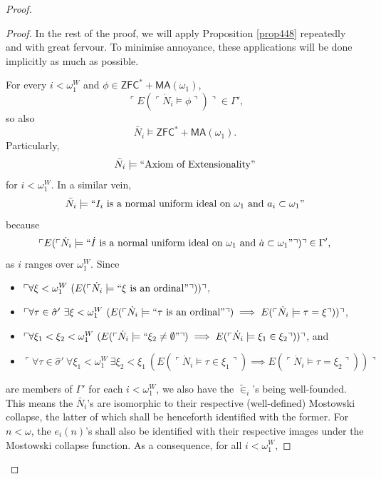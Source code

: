 \documentclass[12pt, twoside]{memoir}
\numberwithin{equation}{section}
\theoremstyle{definition}
\theoremstyle{remark}
\theoremstyle{definition}
\theoremstyle{definition}
\theoremstyle{definition}
\theoremstyle{remark}
\begin{document}
\begin{proof}
\begin{proof}
In the rest of the proof, we will apply Proposition \ref{prop448} repeatedly and with great fervour. To minimise annoyance, these applications will be done implicitly as much as possible. 

For every $i < \omega_1^W$ and $\phi \in \mathsf{ZFC}^* + \mathsf{MA}(\omega_1)$, 
\begin{equation*}
    \ulcorner E(\ulcorner \dot{N}_i \models \phi \urcorner) \urcorner \in \Gamma' \text{,}
\end{equation*}
so also 
\begin{equation*}
    \bar{N}_i \models \mathsf{ZFC}^* + \mathsf{MA}(\omega_1) \text{.}
\end{equation*}
Particularly, 
\begin{equation*}
    \bar{N}_i \models ``\text{Axiom of Extensionality}"
\end{equation*}
for $i < \omega_1^W$. In a similar vein, 
\begin{equation*}
    \bar{N}_i \models ``I_i \text{ is a normal uniform ideal on } \omega_1 \text{ and } a_i \subset \omega_1" 
\end{equation*}
because
\begin{equation*}
    \ulcorner E(\ulcorner \dot{N}_i \models ``\dot{I} \text{ is a normal uniform ideal on } \omega_1 \text{ and } \dot{a} \subset \omega_1" \urcorner) \urcorner \in \Gamma' \text{,}
\end{equation*}
as $i$ ranges over $\omega_1^W$. Since
\begin{itemize}
    \item $\ulcorner \forall \xi < \omega_1^W \ (E(\ulcorner \dot{N}_i \models ``\xi \text{ is an ordinal}" \urcorner)) \urcorner$,
    \item $\ulcorner \forall \tau \in \hat{\sigma}' \ \exists \xi < \omega_1^W \ (E(\ulcorner \dot{N}_i \models ``\tau \text{ is an ordinal}" \urcorner) \implies E(\ulcorner \dot{N}_i \models \tau = \xi \urcorner)) \urcorner$,
    \item $\ulcorner \forall \xi_1 < \xi_2 < \omega_1^W \ (E(\ulcorner \dot{N}_i \models ``\xi_2 \neq \emptyset" \urcorner) \implies E(\ulcorner \dot{N}_i \models \xi_1 \in \xi_2 \urcorner)) \urcorner$, and
    \item $\ulcorner \forall \tau \in \hat{\sigma}' \ \forall \xi_1 < \omega_1^W \ \exists \xi_2 < \xi_1 \ (E(\ulcorner \dot{N}_i \models \tau \in \xi_1  \urcorner) \implies E(\ulcorner \dot{N}_i \models \tau = \xi_2 \urcorner)) \urcorner$
\end{itemize}
are members of $\Gamma'$ for each $i < \omega_1^W$, we also have the $\tilde{\in}_i$'s being well-founded. This means the $\bar{N}_i$'s are isomorphic to their respective (well-defined) Mostowski collapse, the latter of which shall be henceforth identified with the former. For $n < \omega$, the $e_i(n)$'s shall also be identified with their respective images under the Mostowski collapse function. As a consequence, for all $i < \omega_1^W$,

\end{proof}
\end{proof}
\end{document}
